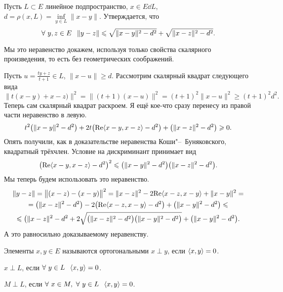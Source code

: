 \begin{Ut}
  Пусть $L\subset E$ линейное подпространство, $x\in E\dd L$, $d = \rho(x,L) = \inf\limits_{y\in L}\|x-y\|$. Утверждается, что
\[
  \forall\ y,z\in E\hskip .75em plus.1em minus.08em\relax\|y-z\|\leqslant \sqrt{\|x-y\|^2 - d^2} + \sqrt{\|x-z\|^2-d^2}.
\]
\end{Ut}
Мы это неравенство докажем, используя только свойства скалярного произведения, то есть без геометрических соображений.

\begin{Proof}
  Пусть $u = \frac{ty+z}{t+1}\in L$, $\|x-u\|\ge d$. Рассмотрим скалярный квадрат следующего вида
\[
  \big\|t(x-y)+x-z)\big\|^2 = \big\|(t+1)(x-u)\big\|^2 = (t+1)^2\|x-u\|^2\ge (t+1)^2d^2.
\]
Теперь сам скалярный квадрат раскроем. Я ещё кое-что сразу перенесу из правой части неравенство в левую.
\[
  t^2\big(\|x-y\|^2-d^2\big)+2t\big(\mathrm{\mathop{Re}}\langle x-y,x-z\rangle -d^2\big) + \big(\|x-z\|^2-d^2\big)\geqslant0.
\]
Опять получили, как в доказательстве неравенства Коши"--~Буняковского, квадратный трёхчлен. Условие на дискриминант принимает вид
\[
  \big(\mathrm{\mathop{Re}}\langle x-y,x-z\rangle -d^2\big)^2\leqslant \big(\|x-y\|^2-d^2\big)\big(\|x-z\|^2-d^2\big).
\]
Мы теперь будем использовать это неравенство.
\begin{multline*}
  \|y-z\| = \big\|(x-z)-(x-y)\big\|^2 = \|x-z\|^2 - 2\mathrm{\mathop{Re}}\langle x-z,x-y\rangle +\|x-y\|^2 =\\
   = \big(\|x-z\|^2-d^2\big) - 2\big(\mathrm{\mathop{Re}}\langle x-z,x-y\rangle -d^2\big) + \big(\|x-y\|^2-d^2\big)\leqslant\\
  \leqslant \big(\|x-z\|^2-d^2+2\sqrt{\big(\|x-z\|^2-d^2\big)\big(\|x-y\|^2-d^2\big)} + \big(\|x-y\|^2-d^2\big).
\end{multline*}
А это равносильно доказываемому неравенству.
\end{Proof}

\begin{Def}
  Элементы $x,y\in E$ называются ортогональными $x\perp y$, если $\langle x,y\rangle =0$.

  $x\perp L$, если $\forall\ y\in L\pau \la x,y\ra =0$.

  $M\perp L$, если $\forall\ x\in M,\ \forall\ y\in L\pau \la x,y\ra =0$.
\end{Def}

